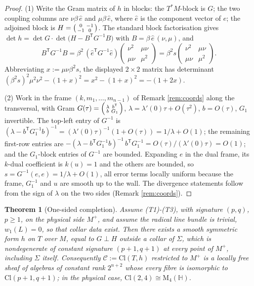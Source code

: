 \documentclass[11pt]{article}
\newtheorem{theorem}{Theorem}[section]
\theoremstyle{definition}
\newcommand{\Cl}{\mathrm{Cl}}
\newcommand{\HH}{\mathbb{H}}
\newcommand{\Mat}{\mathrm{M}}
\newcommand{\shC}{\mathcal{C}}
\newcommand{\shL}{L}
\newcommand{\Sig}{\Sigma}
\newcommand{\Mp}{M^{+}}
\begin{document}
\begin{proof}
(1) Write the Gram matrix of $h$ in blocks: the $T^*M$-block is $G$; the two coupling columns are $\nu\beta\,\hat e$ and $\mu\beta\,\hat e$, where $\hat e$ is the component vector of $e$; the adjoined block is $H = \begin{psmallmatrix} 0 & -1 \\ -1 & 0\end{psmallmatrix}$. The standard block factorisation gives $\det h = \det G \cdot \det\bigl(H - B^{\mathsf T} G^{-1} B\bigr)$ with $B = \beta\,\hat e\,(\nu, \mu)$, and
\[
B^{\mathsf T} G^{-1} B = \beta^2\, (\hat e^{\mathsf T} G^{-1} \hat e) \begin{pmatrix} \nu^2 & \mu\nu \\ \mu\nu & \mu^2 \end{pmatrix} = \beta^2 s \begin{pmatrix} \nu^2 & \mu\nu \\ \mu\nu & \mu^2 \end{pmatrix}.
\]
Abbreviating $x := \mu\nu\beta^2 s$, the displayed $2 \times 2$ matrix has determinant $(\beta^2 s)^2\mu^2\nu^2 - (1 + x)^2 = x^2 - (1+x)^2 = -(1 + 2x)$.

(2) Work in the frame $(k, m_1, \dots, m_{n-1})$ of Remark \ref{rem:coords} along the transversal, with Gram $G(\tau) = \begin{psmallmatrix} \lambda & b^{\mathsf T} \\ b & G_1 \end{psmallmatrix}$, $\lambda = \lambda'(0)\tau + O(\tau^2)$, $b = O(\tau)$, $G_1$ invertible. The top-left entry of $G^{-1}$ is $(\lambda - b^{\mathsf T} G_1^{-1} b)^{-1} = (\lambda'(0)\tau)^{-1}(1 + O(\tau)) = 1/\lambda + O(1)$; the remaining first-row entries are $-(\lambda - b^{\mathsf T} G_1^{-1} b)^{-1}\, b^{\mathsf T} G_1^{-1} = O(\tau)/(\lambda'(0)\tau) = O(1)$; and the $G_1$-block entries of $G^{-1}$ are bounded. Expanding $e$ in the dual frame, its $k$-dual coefficient is $k(u) = 1$ and the others are bounded, so $s = G^{-1}(e,e) = 1/\lambda + O(1)$, all error terms locally uniform because the frame, $G_1^{-1}$ and $u$ are smooth up to the wall. The divergence statements follow from the sign of $\lambda$ on the two sides (Remark \ref{rem:coords}).
\end{proof}

\begin{theorem}[One-sided completion]\label{thm:onesided}
Assume (T1)-(T3), with signature $(p,q)$, $p \geq 1$, on the physical side $\Mp$, and assume the radical line bundle is trivial, $w_1(\shL) = 0$, so that collar data exist. Then there exists a smooth symmetric form $h$ on $T$ over $M$, equal to $G \perp H$ outside a collar of $\Sig$, which is nondegenerate of constant signature $(p{+}1, q{+}1)$ at every point of $\Mp$, including $\Sig$ itself. Consequently $\shC := \Cl(T, h)$ restricted to $\Mp$ is a locally free sheaf of algebras of constant rank $2^{n+2}$ whose every fibre is isomorphic to $\Cl(p{+}1, q{+}1)$; in the physical case, $\Cl(2,4) \cong \Mat_4(\HH)$.
\end{theorem}
\end{document}
